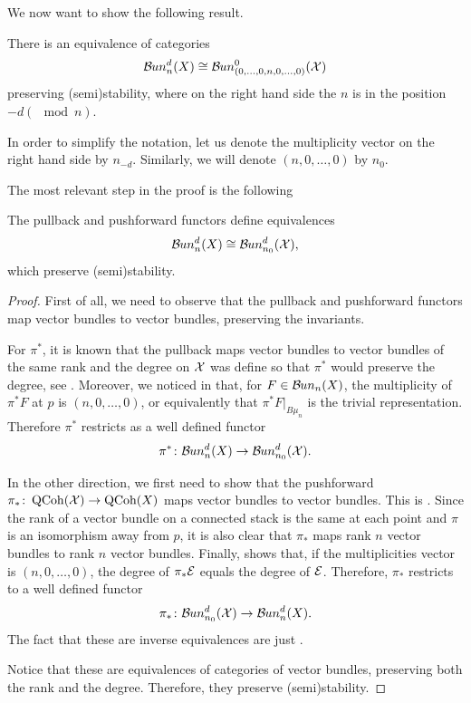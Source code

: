 We now want to show the following result.
\begin{thm} \label{thm: eqv Bun}
There is an equivalence of categories
\begin{equation} \label{equivalence bun pt1}
\mathcal{B}\kern -.5pt un_n^d(X) \cong \mathcal{B}\kern -.5pt un_{(0, \dots, 0, n, 0, \dots, 0 )}^0(\mathcal{X})
\end{equation}
preserving (semi)stability, where on the right hand side the $n$ is in the position $-d (\mod n)$.
\end{thm}

In order to simplify the notation, let us denote the multiplicity vector on the right hand side by $n_{-d}$. Similarly, we will denote $(n, 0, \dots, 0)$ by $n_0$.

The most relevant step in the proof is the following

\begin{lemma} \label{lemma Bun}
The pullback and pushforward functors define equivalences
\begin{equation}
\mathcal{B}\kern -.5pt un_n^d(X) \cong \mathcal{B}\kern -.5pt un_{n_0}^d(\mathcal{X}),
\end{equation}
which preserve (semi)stability.
\end{lemma}

\begin{proof}
First of all, we need to observe that the pullback and pushforward functors map vector bundles to vector bundles, preserving the invariants.

For $\pi^*$, it is known that the pullback maps vector bundles to vector bundles of the same rank and the degree on $\mathcal{X}$ was define so that $\pi^*$ would preserve the degree, see .
Moreover, we noticed in  that, for $F \in \mathcal{B}\kern -.5pt un_n(X)$, the multiplicity of $\pi^*F$ at $p$ is $(n, 0, \dots, 0)$, or equivalently that $\pi^*F \vert_{B \mu_n}$ is the trivial representation.
Therefore $\pi^*$ restricts as a well defined functor
\[
\pi^* \colon \mathcal{B}\kern -.5pt un_n^d(X) \to \mathcal{B}\kern -.5pt un_{n_0}^d(\mathcal{X}).
\]

In the other direction, we first need to show that the pushforward $\pi_* \colon \operatorname{QCoh}(\mathcal{X}) \to \operatorname{QCoh}(X)$ maps vector bundles to vector bundles. This is \cite[Theorem 2.3.4]{abramovich-vistoli}. 
Since the rank of a vector bundle on a connected stack is the same at each point and $\pi$ is an isomorphism away from $p$, it is also clear that $\pi_*$ maps rank $n$ vector bundles to rank $n$ vector bundles. 
Finally,  shows that, if the multiplicities vector is $(n, 0, \dots, 0)$, the degree of $\pi_* \mathcal{E}$ equals the degree of $\mathcal{E}$.
Therefore, $\pi_*$ restricts to a well defined functor
\[
\pi_* \colon \mathcal{B}\kern -.5pt un_{n_0}^d(\mathcal{X}) \to \mathcal{B}\kern -.5pt un_n^d(X).
\]
The fact that these are inverse equivalences are just .

Notice that these are equivalences of categories of vector bundles, preserving both the rank and the degree. Therefore, they preserve (semi)stability.
\end{proof}

